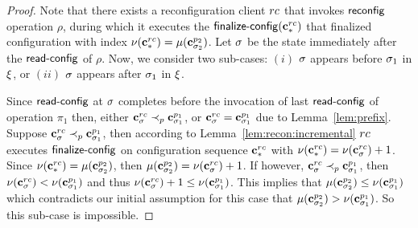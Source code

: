 \begin{proof}
 Note that there exists a reconfiguration client $rc$ that invokes $\act{reconfig}$ operation $\rho$, 
during which it executes the 
$\act{finalize-config}( \cvec{\rec}{*})$ that finalized configuration with index 
$\nu(\mathbf{c}^{rc}_{*}) = \mu(\mathbf{c}^{p_2}_{\sigma_2})$. 
Let $\sigma$ be the state immediately after the $\act{read-config}$ of $\rho$. Now, we consider two sub-cases: $(i)$ $\sigma$ appears before $\sigma_1$ in $\EX$, or  $(ii)$ $\sigma$ appears after $\sigma_1$ in $\EX$.
  \vspace{1em}
  
  Since $\act{read-config}$ at $\sigma$ completes before the invocation of last $\act{read-config}$ of operation  $\pi_1$ then, either
   $\mathbf{c}^{rc}_{\sigma}  \prec_p \mathbf{c}^{p_1}_{\sigma_1}$, or $\mathbf{c}^{rc}_{\sigma}  = \mathbf{c}^{p_1}_{\sigma_1}$ due to Lemma~\ref{lem:prefix}.  
  Suppose  $\mathbf{c}^{rc}_{\sigma}  \prec_p \mathbf{c}^{p_1}_{\sigma_1}$,  then according to Lemma~\ref{lem:recon:incremental} $rc$  executes $\act{finalize-config}$  on configuration sequence  $\mathbf{c}^{rc}_{*}$ with  $\nu(\mathbf{c}^{rc}_{*}) = \nu(\mathbf{c}^{rc}_{\sigma}) + 1$. 
  Since $\nu(\mathbf{c}^{rc}_{*}) = \mu(\mathbf{c}^{p_2}_{\sigma_2})$, then
  $\mu(\mathbf{c}^{p_2}_{\sigma_2}) = \nu(\mathbf{c}^{rc}_{\sigma}) + 1$. 
  If however, $\mathbf{c}^{rc}_{\sigma}  \prec_p \mathbf{c}^{p_1}_{\sigma_1}$, then 
  $\nu(\mathbf{c}^{rc}_{\sigma}) < \nu(\mathbf{c}^{p_1}_{\sigma_1})$ and thus 
  $\nu(\mathbf{c}^{rc}_{\sigma})+1 \leq \nu(\mathbf{c}^{p_1}_{\sigma_1})$. 
  This implies that
      $\mu(\mathbf{c}^{p_2}_{\sigma_2})  \leq  \nu(\mathbf{c}^{p_1}_{\sigma_1})$  which 
      contradicts our initial assumption for this case that $\mu(\mathbf{c}^{p_2}_{\sigma_2}) >  \nu(\mathbf{c}^{p_1}_{\sigma_1})$. So this sub-case is impossible.


\end{proof}
